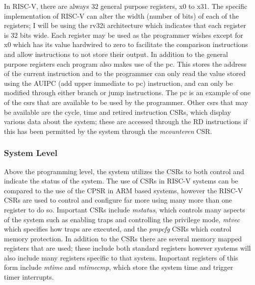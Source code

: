 In RISC-V, there are always 32 general purpose registers, x0 to x31. The specific implementation of RISC-V can alter the width (number of bits) of each of the registers; I will be using the rv32i architecture which indicates that each register is 32 bits wide. Each register may be used as the programmer wishes except for x0 which has its value hardwired to zero to facilitate the comparison instructions and allow instructions to not store their output. In addition to the general purpose registers each program also makes use of the \ac{pc}. This stores the address of the current instruction and to the programmer can only read the value stored using the AUIPC (add upper immediate to pc) instruction, and can only be modified through either branch or jump instructions. The pc is an example of one of the  \ac{csrs} that are available to be used by the programmer. Other \ac{csrs} that may be available are the cycle, time and retired instruction CSRs, which display various data about the system; these are accessed through the RD instructions if this has been permitted by the system through the \textit{mcounteren} CSR.
\subsubsection{System Level}
Above the programming level, the system utilizes the CSRs to both control and indicate the status of the system. The use of CSRs in RISC-V systems can be compared to the use of the CPSR in ARM based systems, however the RISC-V CSRs are used to control and configure far more using many more than one register to do so. Important CSRs include \textit{mstatus}, which controls many aspects of the system such as enabling traps and controlling the privilege mode, \textit{mtvec} which specifies how traps are executed, and the \textit{pmpcfg} CSRs which control memory protection. In addition to the CSRs there are several memory mapped registers that are used; these include both standard registers however systems will also include many registers specific to that system. Important registers of this form include \textit{mtime} and \textit{mtimecmp}, which store the system time and trigger timer interrupts.
